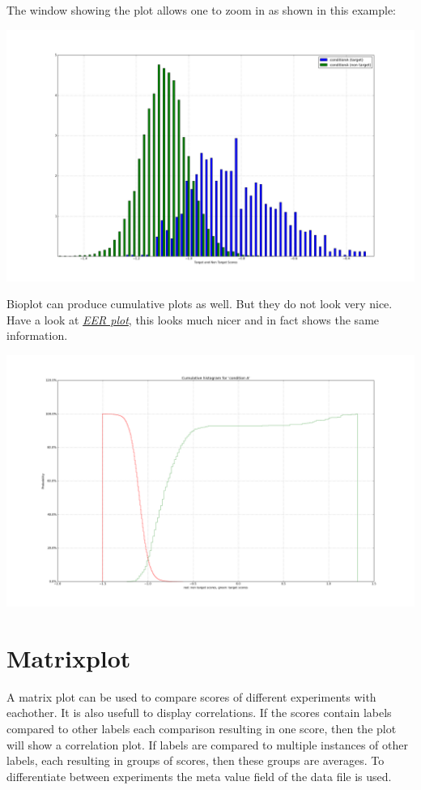 \documentclass[letterpaper,10pt,english]{sphinxmanual}
\begin{document}
The window showing the plot allows one to zoom in as shown in this example:

\includegraphics{images/condition_A_histogram_plot_detail.png}

Bioplot can produce cumulative plots as well. But they do not look very nice.
Have a look at {\hyperref[eerplot:eerplot-label]{\emph{EER plot}}}, this looks much nicer and in fact shows the same information.

\includegraphics{images/condition_A_cumulative_histogram_plot.png}


\chapter{Matrixplot}
\label{matrixplot:matrixplot}\label{matrixplot::doc}
A matrix plot can be used to compare scores of different experiments with eachother. It is also usefull to display correlations. If the scores contain labels compared to other labels each comparison resulting in one score, then the plot will show a correlation plot. If labels are compared to multiple instances of other labels, each resulting in groups of scores, then these groups are averages.
To differentiate between experiments the meta value field of the data file is used.
\end{document}
